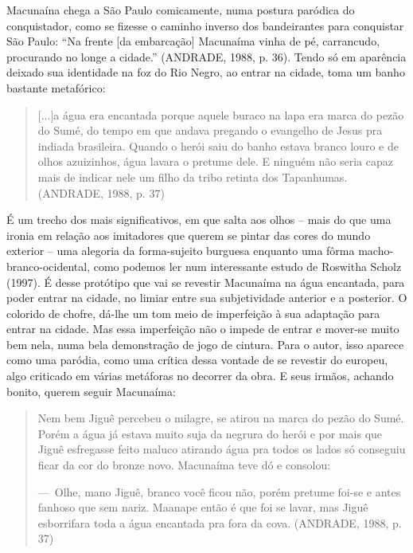 Macunaína chega a São Paulo comicamente\emph{,} numa postura paródica do
conquistador, como se fizesse o caminho inverso dos bandeirantes para
conquistar São Paulo: ``Na frente {[}da embarcação{]} Macunaíma vinha de
pé, carrancudo, procurando no longe a cidade.'' (ANDRADE, 1988, p. 36).
Tendo só em aparência deixado sua identidade na foz do Rio Negro, ao
entrar na cidade, toma um banho bastante metafórico:

\begin{quote}
{[}...{]}a água era encantada porque aquele buraco na lapa era marca do
pezão do Sumé, do tempo em que andava pregando o evangelho de Jesus pra
indiada brasileira. Quando o herói saiu do banho estava branco louro e
de olhos azuizinhos, água lavara o pretume dele. E ninguém não seria
capaz mais de indicar nele um filho da tribo retinta dos Tapanhumas.
(ANDRADE, 1988, p. 37)
\end{quote}

É um trecho dos mais significativos, em que salta aos olhos -- mais do
que uma ironia em relação aos imitadores que querem se pintar das cores
do mundo exterior -- uma alegoria da forma-sujeito burguesa enquanto uma
fôrma macho-branco-ocidental, como podemos ler num interessante estudo
de Roswitha Scholz (1997). É desse protótipo que vai se revestir
Macunaíma na água encantada, para poder entrar na cidade, no limiar
entre sua subjetividade anterior e a posterior. O colorido de chofre,
dá-lhe um tom meio de imperfeição à sua adaptação para entrar na cidade.
Mas essa imperfeição não o impede de entrar e mover-se muito bem nela,
numa bela demonstração de jogo de cintura. Para o autor, isso aparece
como uma paródia, como uma crítica dessa vontade de se revestir do
europeu, algo criticado em várias metáforas no decorrer da obra. E seus
irmãos, achando bonito, querem seguir Macunaíma:

\begin{quote}
Nem bem Jiguê percebeu o milagre, se atirou na marca do pezão do Sumé.
Porém a água já estava muito suja da negrura do herói e por mais que
Jiguê esfregasse feito maluco atirando água pra todos os lados só
conseguiu ficar da cor do bronze novo. Macunaíma teve dó e consolou:

---~Olhe, mano Jiguê, branco você ficou não, porém pretume foi-se e
antes fanhoso que sem nariz. Maanape então é que foi se lavar, mas Jiguê
esborrifara toda a água encantada pra fora da cova. (ANDRADE, 1988, p.
37)
\end{quote}


